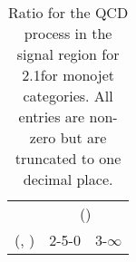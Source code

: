 \begin{table}[h!]
\tiny
\centering
\caption{Ratio for the QCD process in the signal region for 2.1\ifb for monojet categories. All entries are non-zero but are truncated to one decimal place.\label{tab:ratiosepnaive_sig_qcd_mono}}
\begin{tabular}
{ccc}
	\hline\hline
	& \multicolumn{2}{c}{\scalht (\gev)} \\ 
	 (\njet,  \nb) & 2-5-0 & 3-$\infty$ \\ [0.8ex] 
\hline
	\hline
	\hline
\end{tabular}
\end{table}
